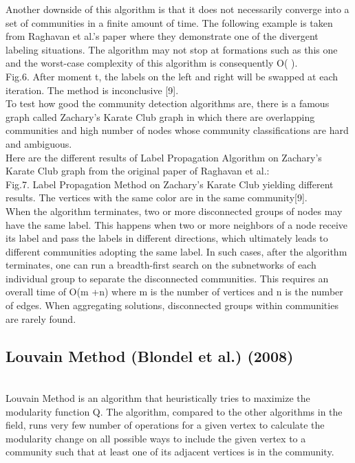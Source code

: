 \documentclass[10pt]{article}
\begin{document}
Another downside of this algorithm is that it does not necessarily converge into a set of communities in a finite amount of time. The following example is taken from Raghavan et al.’s paper where they demonstrate one of the divergent labeling situations. The algorithm may not stop at formations such as this one and the worst-case complexity of this algorithm is consequently O( ). \\

 Fig.6. After moment t, the labels on the left and right will be swapped at each iteration. The method is inconclusive [9]. \\
 
To test how good the community detection algorithms are, there is a famous graph called Zachary’s Karate Club graph in which there are overlapping communities and high number of nodes whose community classifications are hard and ambiguous. \\

Here are the different results of Label Propagation Algorithm on Zachary’s Karate Club graph from the original paper of Raghavan et al.: \\

  Fig.7. Label Propagation Method on Zachary’s Karate Club yielding different results. The vertices with the same color are in the same community[9]. \\
  
When the algorithm terminates, two or more disconnected groups of nodes may have the same label. This happens when two or more neighbors of a node receive its label and pass the labels in different directions, which ultimately leads to different communities adopting the same label. In such cases, after the algorithm terminates, one can run a breadth-first search on the subnetworks of each individual group to separate the disconnected communities. This requires an overall time of O(m +n) where m is the number of vertices and n is the number of edges. When aggregating solutions, disconnected groups within communities are rarely found. \\

\subsection{Louvain Method (Blondel et al.) (2008)} \\

Louvain Method is an algorithm that heuristically tries to maximize the modularity function Q. The algorithm, compared to the other algorithms in the field, runs very few number of operations for a given vertex to calculate the modularity change on all possible ways to include the given vertex to a community such that at least one of its adjacent vertices is in the community. \\
\end{document}
